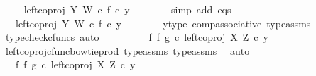 \begin{isabellebody}
\ \isamarkupfalse%
\ {\isachardoublequoteopen}{\isachardot}{\kern0pt}{\isachardot}{\kern0pt}{\isachardot}{\kern0pt}\ {\isacharequal}{\kern0pt}\ left{\isacharunderscore}{\kern0pt}coproj\ Y\ W\ {\isasymcirc}\isactrlsub c\ f\ {\isasymcirc}\isactrlsub c\ y{\isachardoublequoteclose}\isanewline
\ \ \ \ \ \ \isamarkupfalse%
\ {\isacharparenleft}{\kern0pt}simp\ add{\isacharcolon}{\kern0pt}\ eqs{\isacharparenright}{\kern0pt}\isanewline
\ \ \ \ \isamarkupfalse%
\ \isamarkupfalse%
\ {\isachardoublequoteopen}{\isachardot}{\kern0pt}{\isachardot}{\kern0pt}{\isachardot}{\kern0pt}\ {\isacharequal}{\kern0pt}\ {\isacharparenleft}{\kern0pt}left{\isacharunderscore}{\kern0pt}coproj\ Y\ W\ {\isasymcirc}\isactrlsub c\ f{\isacharparenright}{\kern0pt}\ {\isasymcirc}\isactrlsub c\ y{\isachardoublequoteclose}\isanewline
\ \ \ \ \ \ \isamarkupfalse%
\ y{\isacharunderscore}{\kern0pt}type{}\ comp{\isacharunderscore}{\kern0pt}associative{}\ type{\isacharunderscore}{\kern0pt}assms{\isacharparenleft}{\kern0pt}{}{\isacharparenright}{\kern0pt}\ \isamarkupfalse%
\ {\isacharparenleft}{\kern0pt}typecheck{\isacharunderscore}{\kern0pt}cfuncs{\isacharcomma}{\kern0pt}\ auto{\isacharparenright}{\kern0pt}\isanewline
\ \ \ \ \isamarkupfalse%
\ \isamarkupfalse%
\ {\isachardoublequoteopen}{\isachardot}{\kern0pt}{\isachardot}{\kern0pt}{\isachardot}{\kern0pt}\ {\isacharequal}{\kern0pt}\ {\isacharparenleft}{\kern0pt}{\isacharparenleft}{\kern0pt}f\ {\isasymbowtie}\isactrlsub f\ g{\isacharparenright}{\kern0pt}\ {\isasymcirc}\isactrlsub c\ left{\isacharunderscore}{\kern0pt}coproj\ X\ Z{\isacharparenright}{\kern0pt}\ {\isasymcirc}\isactrlsub c\ y{\isachardoublequoteclose}\isanewline
\ \ \ \ \ \ \isamarkupfalse%
\ left{\isacharunderscore}{\kern0pt}coproj{\isacharunderscore}{\kern0pt}cfunc{\isacharunderscore}{\kern0pt}bowtie{\isacharunderscore}{\kern0pt}prod\ type{\isacharunderscore}{\kern0pt}assms{\isacharparenleft}{\kern0pt}{}{\isacharparenright}{\kern0pt}\ type{\isacharunderscore}{\kern0pt}assms{\isacharparenleft}{\kern0pt}{}{\isacharparenright}{\kern0pt}\ \isamarkupfalse%
\ auto\isanewline
\ \ \ \ \isamarkupfalse%
\ \isamarkupfalse%
\ {\isachardoublequoteopen}{\isachardot}{\kern0pt}{\isachardot}{\kern0pt}{\isachardot}{\kern0pt}\ {\isacharequal}{\kern0pt}\ {\isacharparenleft}{\kern0pt}f\ {\isasymbowtie}\isactrlsub f\ g{\isacharparenright}{\kern0pt}\ {\isasymcirc}\isactrlsub c\ left{\isacharunderscore}{\kern0pt}coproj\ X\ Z\ {\isasymcirc}\isactrlsub c\ y{\isachardoublequoteclose}\isanewline

\end{isabellebody}
